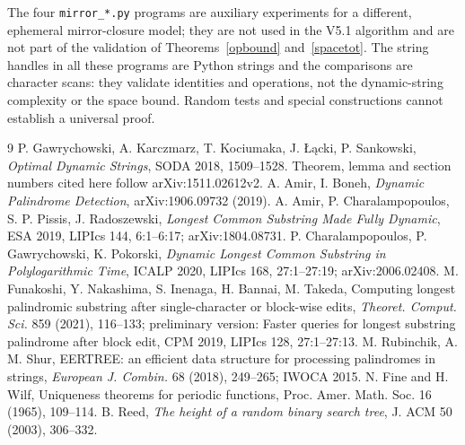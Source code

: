 ﻿\documentclass[11pt]{article}
\theoremstyle{plain}
\theoremstyle{remark}
\begin{document}
The four \texttt{mirror\_*.py} programs are auxiliary experiments for a different, ephemeral mirror-closure model; they are not used in the V5.1 algorithm and are not part of the validation of Theorems~\ref{opbound} and~\ref{spacetot}. The string handles in all these programs are Python strings and the comparisons are character scans: they validate identities and operations, not the dynamic-string complexity or the space bound. Random tests and special constructions cannot establish a universal proof.
\begin{thebibliography}{9}\footnotesize\setlength{\itemsep}{0pt}\setlength{\parsep}{0pt}
 P. Gawrychowski, A. Karczmarz, T. Kociumaka, J. {\L}\k{a}cki, P. Sankowski, \emph{Optimal Dynamic Strings}, SODA 2018, 1509--1528. Theorem, lemma and section numbers cited here follow arXiv:1511.02612v2.
 A. Amir, I. Boneh, \emph{Dynamic Palindrome Detection}, arXiv:1906.09732 (2019).
 A. Amir, P. Charalampopoulos, S. P. Pissis, J. Radoszewski, \emph{Longest Common Substring Made Fully Dynamic}, ESA 2019, LIPIcs 144, 6:1--6:17; arXiv:1804.08731.
 P. Charalampopoulos, P. Gawrychowski, K. Pokorski, \emph{Dynamic Longest Common Substring in Polylogarithmic Time}, ICALP 2020, LIPIcs 168, 27:1--27:19; arXiv:2006.02408.
 M. Funakoshi, Y. Nakashima, S. Inenaga, H. Bannai, M. Takeda, Computing longest palindromic substring after single-character or block-wise edits, \emph{Theoret. Comput. Sci.} 859 (2021), 116--133; preliminary version: Faster queries for longest substring palindrome after block edit, CPM 2019, LIPIcs 128, 27:1--27:13.
 M. Rubinchik, A. M. Shur, EERTREE: an efficient data structure for processing palindromes in strings, \emph{European J. Combin.} 68 (2018), 249--265; IWOCA 2015.
 N. Fine and H. Wilf, Uniqueness theorems for periodic functions, Proc. Amer. Math. Soc. 16 (1965), 109--114.
 B. Reed, \emph{The height of a random binary search tree}, J. ACM 50 (2003), 306--332.
\end{thebibliography}
\end{document}

